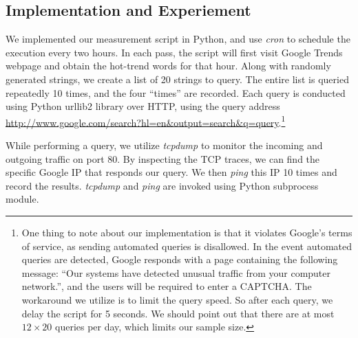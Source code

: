 

\subsection{Implementation and Experiement}
\label{sec:impl-exper}


We implemented our measurement script in Python, and use {\it cron} to schedule the execution every two hours. In each pass, the script will first visit Google Trends webpage and obtain the hot-trend words for that hour. Along with randomly generated strings, we create a list of 20 strings to query. 
The entire list is queried repeatedly 10 times, and the four ``times'' are recorded. Each query is conducted using Python urllib2 library over HTTP, using the query address \url{http://www.google.com/search?hl=en\&output=search\&q=query}.\footnote{One thing to note about our implementation is that it violates Google's terms of service, as sending automated queries is disallowed. In the event automated queries are detected, Google responds with a page containing the following message: ``Our systems have detected unusual traffic from your computer network.'', and the users will be required to enter a CAPTCHA. The workaround we utilize is to limit the query speed. So after each query, we delay the script for 5 seconds. We should point out that there are at most $12\times20$ queries per day, which limits our sample size.}

While performing a query, we utilize {\it tcpdump} to monitor the incoming and outgoing traffic on port 80. By inspecting the TCP traces, we can find the specific Google IP that responds our query. We then {\it ping} this IP 10 times and record the results. {\it tcpdump} and {\it ping} are invoked using Python subprocess module.

